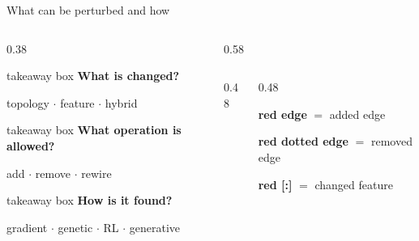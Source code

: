 \begin{frame}{What can be perturbed and how}
  \begin{columns}[T,onlytextwidth]
    \begin{column}{0.38\textwidth}
      \begin{beamercolorbox}[wd=\linewidth,rounded=true,sep=0.48em]{takeaway box}
        {\color{PresThreeAttack}\bfseries What is changed?}\par
        {\small topology \(\cdot\) feature \(\cdot\) hybrid}
      \end{beamercolorbox}
      \vspace{0.25em}
      \begin{beamercolorbox}[wd=\linewidth,rounded=true,sep=0.48em]{takeaway box}
        {\color{PresThreeAttack}\bfseries What operation is allowed?}\par
        {\small add \(\cdot\) remove \(\cdot\) rewire}
      \end{beamercolorbox}
      \vspace{0.25em}
      \begin{beamercolorbox}[wd=\linewidth,rounded=true,sep=0.48em]{takeaway box}
        {\color{PresThreeAttack}\bfseries How is it found?}\par
        {\footnotesize gradient \(\cdot\) genetic \(\cdot\) RL \(\cdot\) generative}
      \end{beamercolorbox}
    \end{column}
    \begin{column}{0.58\textwidth}
      \begin{columns}[c,onlytextwidth]
        \begin{column}{0.48\textwidth}
          \centering
          \ToyGraph[rewired][0.72]
        \end{column}
        \begin{column}{0.48\textwidth}
          {\scriptsize
            {\color{PresThreeAttack}\bfseries red edge} \(=\) added edge\par
            \vspace{0.25em}
            {\color{PresThreeAttack}\bfseries red dotted edge} \(=\) removed edge\par
            \vspace{0.25em}
            {\color{PresThreeAttack}\bfseries red [:]} \(=\) changed feature
          }
        \end{column}
      \end{columns}

\end{column}
\end{columns}
\end{frame}
